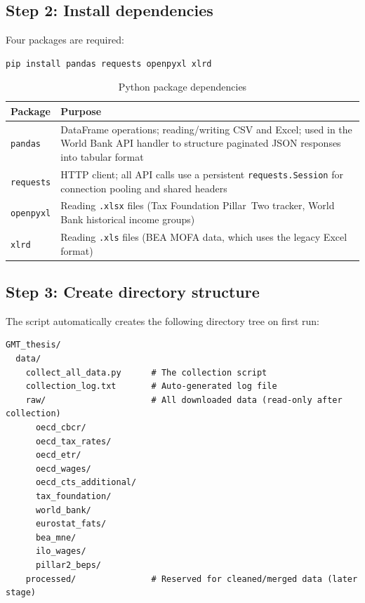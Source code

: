 \documentclass[12pt,a4paper]{article}
\begin{document}
\subsection{Step 2: Install dependencies}

Four packages are required:

\begin{lstlisting}[style=shellstyle,caption={Installing dependencies}]
pip install pandas requests openpyxl xlrd
\end{lstlisting}

\begin{table}[H]
\centering
\caption{Python package dependencies}
\label{tab:packages}
\begin{tabular}{lp{8cm}}
\toprule
\textbf{Package} & \textbf{Purpose} \\
\midrule
\texttt{pandas} & DataFrame operations; reading/writing CSV and Excel; used in the World Bank API handler to structure paginated JSON responses into tabular format \\
\texttt{requests} & HTTP client; all API calls use a persistent \texttt{requests.Session} for connection pooling and shared headers \\
\texttt{openpyxl} & Reading \texttt{.xlsx} files (Tax Foundation Pillar~Two tracker, World Bank historical income groups) \\
\texttt{xlrd} & Reading \texttt{.xls} files (BEA MOFA data, which uses the legacy Excel format) \\
\bottomrule
\end{tabular}
\end{table}

\subsection{Step 3: Create directory structure}

The script automatically creates the following directory tree on first run:

\begin{lstlisting}[style=shellstyle,caption={Directory structure}]
GMT_thesis/
  data/
    collect_all_data.py      # The collection script
    collection_log.txt       # Auto-generated log file
    raw/                     # All downloaded data (read-only after collection)
      oecd_cbcr/
      oecd_tax_rates/
      oecd_etr/
      oecd_wages/
      oecd_cts_additional/
      tax_foundation/
      world_bank/
      eurostat_fats/
      bea_mne/
      ilo_wages/
      pillar2_beps/
    processed/               # Reserved for cleaned/merged data (later stage)
\end{lstlisting}
\end{document}
